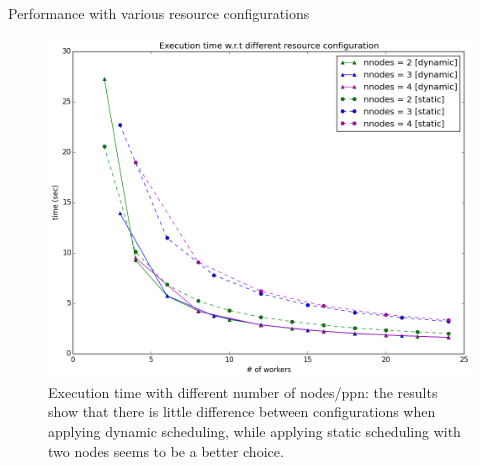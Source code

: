 \documentclass[12pt]{article}
\makeatletter
\renewenvironment{itemize}
{\list{$\bullet$}{\leftmargin\z@ \labelwidth\z@ \itemindent-\leftmargin
\let\makelabel\descriptionlabel}}
{\endlist}
\makeatother
\begin{document}
\begin{itemize}
    \item Performance with various resource configurations
    \begin{figure}
        \includegraphics[scale=.5]{./res_dist_exec.png}
        \vspace{-.5cm}
        \caption{Execution time with different number of nodes/ppn: the results show that there is little difference between configurations when applying dynamic scheduling, while applying static scheduling with two nodes seems to be a better choice.}
    \end{figure}


\end{itemize}
\end{document}
